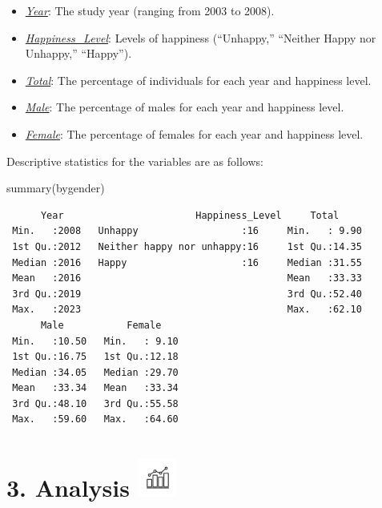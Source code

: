 \documentclass[
  11pt,
  a4paper,
  DIV=11,
  numbers=noendperiod]{scrartcl}
\newenvironment{Shaded}{\begin{snugshade}}{\end{snugshade}}
\newcommand{\FunctionTok}[1]{\textcolor[rgb]{0.28,0.35,0.67}{#1}}
\newcommand{\NormalTok}[1]{\textcolor[rgb]{0.00,0.23,0.31}{#1}}
\begin{document}
\begin{itemize}
\item
  \ul{\emph{Year}}: The study year (ranging from 2003 to 2008).
\item
  \ul{\emph{Happiness\_Level}}: Levels of happiness (``Unhappy,''
  ``Neither Happy nor Unhappy,'' ``Happy'').
\item
  \ul{\emph{Total}}: The percentage of individuals for each year and
  happiness level.
\item
  \ul{\emph{Male}}: The percentage of males for each year and happiness
  level.
\item
  \ul{\emph{Female}}: The percentage of females for each year and
  happiness level.
\end{itemize}

Descriptive statistics for the variables are as follows:

\begin{Shaded}
\begin{Highlighting}[]
 \FunctionTok{summary}\NormalTok{(bygender)}
\end{Highlighting}
\end{Shaded}

\begin{verbatim}
      Year                       Happiness_Level     Total      
 Min.   :2008   Unhappy                  :16     Min.   : 9.90  
 1st Qu.:2012   Neither happy nor unhappy:16     1st Qu.:14.35  
 Median :2016   Happy                    :16     Median :31.55  
 Mean   :2016                                    Mean   :33.33  
 3rd Qu.:2019                                    3rd Qu.:52.40  
 Max.   :2023                                    Max.   :62.10  
      Male           Female     
 Min.   :10.50   Min.   : 9.10  
 1st Qu.:16.75   1st Qu.:12.18  
 Median :34.05   Median :29.70  
 Mean   :33.34   Mean   :33.34  
 3rd Qu.:48.10   3rd Qu.:55.58  
 Max.   :59.60   Max.   :64.60  
\end{verbatim}

\section[3. Analysis \hfill
]{\texorpdfstring{3. Analysis
\protect\includegraphics[width=0.5in,height=\textheight,keepaspectratio]{assets/images/analysis.png}\hfill
}{3. Analysis }}\label{analysis}
\end{document}
